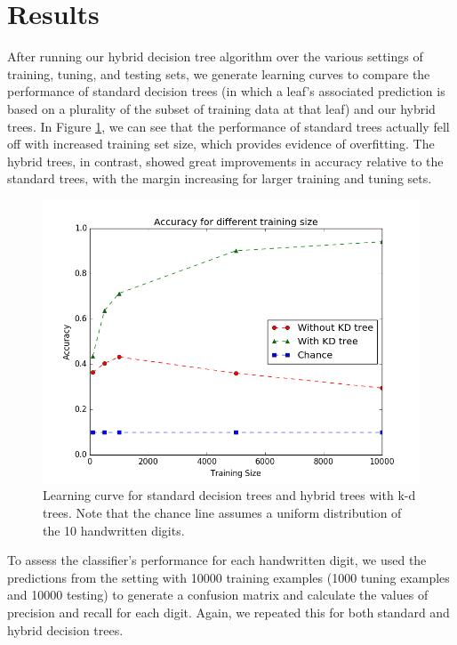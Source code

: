 \section{Results}
After running our hybrid decision tree algorithm over the various settings of training, tuning, and testing sets, we generate learning curves to compare the performance of standard decision trees (in which a leaf's associated prediction is based on a plurality of the subset of training data at that leaf) and our hybrid trees.  In Figure \ref{fig:learn_curve}, we can see that the performance of standard trees actually fell off with increased training set size, which provides evidence of overfitting. The hybrid trees, in contrast, showed great improvements in accuracy relative to the standard trees, with the margin increasing for larger training and tuning sets.

\begin{figure}
	\includegraphics[width=\linewidth]{Figures/learning_curve.png}
	\caption{Learning curve for standard decision trees and hybrid trees with k-d trees.  Note that the chance line assumes a uniform distribution of the 10 handwritten digits.}
	\label{fig:learn_curve}
\end{figure}

To assess the classifier's performance for each handwritten digit, we used the predictions from the setting with 10000 training examples (1000 tuning examples and 10000 testing) to generate a confusion matrix and calculate the values of precision and recall for each digit.  Again, we repeated this for both standard and hybrid decision trees.


